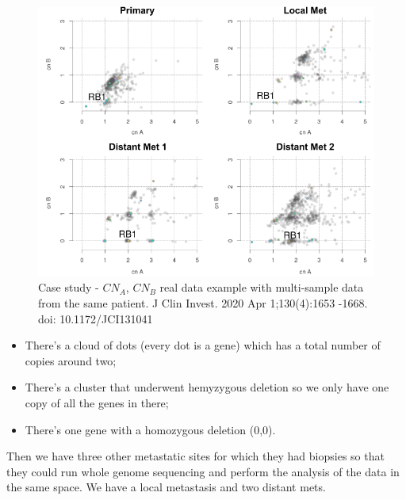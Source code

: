 \begin{figure}[H]
\centering
\includegraphics[width=0.7\linewidth]{image15.png}
\caption{Case study - $CN_A$, $CN_B$ real data example with multi-sample data from the same patient. J Clin Invest. 2020 Apr 1;130(4):1653 -1668. doi: 10.1172/JCI131041}
\label{fig:img15}
\end{figure}

\begin{itemize}
\item
  There's a cloud of dots (every dot is a gene) which has a total number of copies around two;
\item
  There's a cluster that underwent hemyzygous deletion so we only have one copy of all the genes in there;
\item
  There's one gene with a homozygous deletion (0,0).
\end{itemize}

Then we have three other metastatic sites for which they had biopsies so that they could run whole genome sequencing and perform the analysis of the data in the same space. We have a local metastasis and two distant mets.

